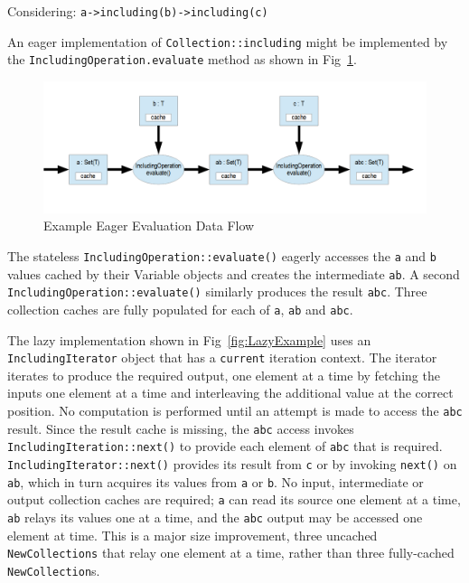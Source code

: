 \documentclass{llncs}
\begin{document}
Considering: \verb$a->including(b)->including(c)$

An eager implementation of \verb$Collection::including$ might be implemented by the \verb$IncludingOperation.evaluate$ method as shown in Fig~\ref{fig:EagerExample}. 

\begin{figure}
	\begin{center}
		\includegraphics[width=4.5in]{EagerExample.png}
	\end{center}
	\caption{Example Eager Evaluation Data Flow}
	\label{fig:EagerExample}
\end{figure}

The stateless \verb$IncludingOperation::evaluate()$ eagerly accesses the \verb$a$ and \verb$b$ values cached by their Variable objects and creates the intermediate \verb$ab$. A second \verb$IncludingOperation::evaluate()$ similarly produces the result \verb$abc$. Three collection caches are fully populated for each of \verb$a$, \verb$ab$ and \verb$abc$.

The lazy implementation shown in Fig~\ref{fig:LazyExample} uses an \verb$IncludingIterator$ object that has a \verb$current$ iteration context. The iterator iterates to produce the required output, one element at a time by fetching the inputs one element at a time and interleaving the additional value at the correct position. No computation is performed until an attempt is made to access the \verb$abc$ result. Since the result cache is missing, the \verb$abc$ access invokes \verb$IncludingIteration::next()$ to provide each element of \verb$abc$ that is required. \verb$IncludingIterator::next()$ provides its result from \verb$c$ or by invoking \verb$next()$ on \verb$ab$, which in turn acquires its values from \verb$a$ or \verb$b$. No input, intermediate or output collection caches are required; \verb$a$ can read its source one element at a time, \verb$ab$ relays its values one at a time, and the \verb$abc$ output may be accessed one element at time. This is a major size improvement, three uncached \verb$NewCollections$ that relay one element at a time, rather than three fully-cached \verb$NewCollection$s.
\end{document}
